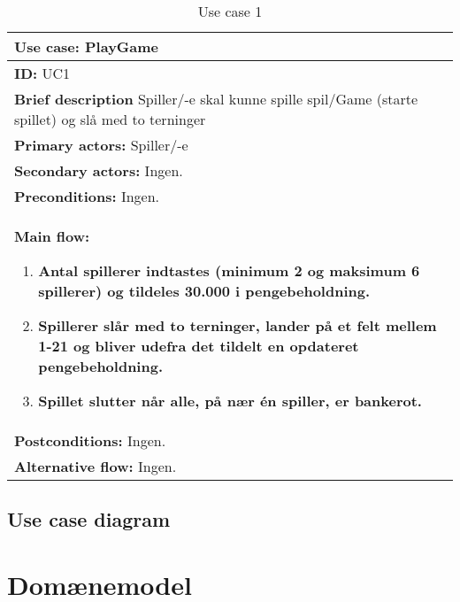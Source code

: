 \begin{table}[H]
    \begin{center}
        \begin{tabular}{ | p{15cm} |}
            \hline
            \textbf{Use case:} PlayGame \\ \hline
            \textbf{ID:} UC1 \\ \hline
            \textbf{Brief description} Spiller/-e skal kunne spille spil/Game (starte spillet) og slå med to terninger     \\ \hline
            \textbf{Primary actors:} Spiller/-e \\ \hline
            \textbf{Secondary actors:} Ingen. \\ \hline
            \textbf{Preconditions:} Ingen.     \\ \hline
            \textbf{Main flow:}
            \begin{enumerate}
                \item \textbf{Antal spillerer indtastes (minimum 2 og maksimum 6 spillerer) og tildeles 30.000 i pengebeholdning.}
                \item \textbf{Spillerer slår med to terninger, lander på et felt mellem 1-21 og bliver udefra det tildelt en opdateret pengebeholdning.}
                \item \textbf{Spillet slutter når alle, på nær én spiller, er bankerot.}
            \end{enumerate} \\ \hline
            \textbf{Postconditions:} Ingen.\\ \hline
            \textbf{Alternative flow:} Ingen.\\ \hline
            \hline
        \end{tabular}
        \caption{Use case 1}
        \label{usecase:1}
    \end{center}
\end{table}

\subsection{Use case diagram}

\section{Domænemodel}